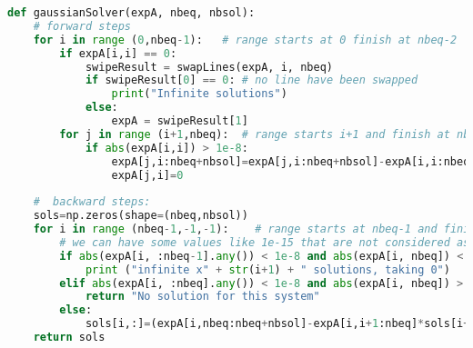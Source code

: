 \begin{lstlisting}[language=Python, style=jupycolors]
def gaussianSolver(expA, nbeq, nbsol):
    # forward steps
    for i in range (0,nbeq-1):   # range starts at 0 finish at nbeq-2 
        if expA[i,i] == 0:
            swipeResult = swapLines(expA, i, nbeq)
            if swipeResult[0] == 0: # no line have been swapped
                print("Infinite solutions")
            else:
                expA = swipeResult[1]
        for j in range (i+1,nbeq):  # range starts i+1 and finish at nbeq-1
            if abs(expA[i,i]) > 1e-8:
                expA[j,i:nbeq+nbsol]=expA[j,i:nbeq+nbsol]-expA[i,i:nbeq+nbsol]*expA[j,i]/expA[i,i];
                expA[j,i]=0
    
    #  backward steps:
    sols=np.zeros(shape=(nbeq,nbsol))
    for i in range (nbeq-1,-1,-1):    # range starts at nbeq-1 and finish 0 (third param is step)
        # we can have some values like 1e-15 that are not considered as 0 whereas it should
        if abs(expA[i, :nbeq-1].any()) < 1e-8 and abs(expA[i, nbeq]) < 1e-8:
            print ("infinite x" + str(i+1) + " solutions, taking 0")
        elif abs(expA[i, :nbeq].any()) < 1e-8 and abs(expA[i, nbeq]) > 1e-8:
            return "No solution for this system"
        else:
            sols[i,:]=(expA[i,nbeq:nbeq+nbsol]-expA[i,i+1:nbeq]*sols[i+1:nbeq,:])/expA[i,i]
    return sols
\end{lstlisting}